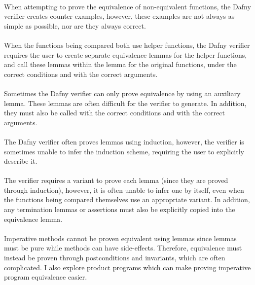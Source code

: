 \paragraph{} When attempting to prove the equivalence of non-equivalent functions, the Dafny verifier creates counter-examples, however, these examples are not always as simple as possible, nor are they always correct.
\paragraph{} When the functions being compared both use helper functions, the Dafny verifier requires the user to create separate equivalence lemmas for the helper functions, and call these lemmas within the lemma for the original functions, under the correct conditions and with the correct arguments.
\paragraph{} Sometimes the Dafny verifier can only prove equivalence by using an auxiliary lemma. These lemmas are often difficult for the verifier to generate. In addition, they must also be called with the correct conditions and with the correct arguments.
\paragraph{} The Dafny verifier often proves lemmas using induction, however, the verifier is sometimes unable to infer the induction scheme, requiring the user to explicitly describe it.
\paragraph{} The verifier requires a variant to prove each lemma (since they are proved through induction), however, it is often unable to infer one by itself, even when the functions being compared themselves use an appropriate variant. In addition, any termination lemmas or assertions must also be explicitly copied into the equivalence lemma. 
\paragraph{} Imperative methods cannot be proven equivalent using lemmas since lemmas must be pure while methods can have side-effects. Therefore, equivalence must instead be proven through postconditions and invariants, which are often complicated. I also explore product programs\parencite{lahiriDifferentialAssertionChecking2013} which can make proving imperative program equivalence easier. 
